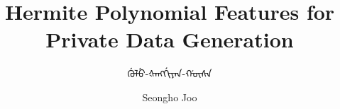\documentclass[9pt,t,aspectratio=169]{beamer}
\title{Hermite Polynomial Features for Private Data Generation}
\subtitle{ᡤᡠᠯᡠ-ᡧᠠᠩᡤᡳᠶᠠᠨ-ᡤᡡᠰᠠ}
\date{}
\author{Seongho Joo}
\institute{SNU MILAB}
\begin{document}
\begin{frame}{}
\end{frame}
\end{document}

